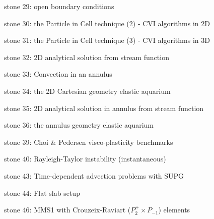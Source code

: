 {\noindent stone 29: open boundary conditions


\noindent stone 30: the Particle in Cell technique (2) - CVI algorithms in 2D


\noindent stone 31: the Particle in Cell technique (3) - CVI algorithms in 3D


\noindent stone 32: 2D analytical solution from stream function


\noindent stone 33: Convection in an annulus 


\noindent stone 34: the 2D Cartesian geometry elastic aquarium


\noindent stone 35: 2D analytical solution in annulus from stream function 


\noindent stone 36: the annulus geometry elastic aquarium


\noindent stone 39: Choi \& Pedersen visco-plasticity benchmarks 


\noindent stone 40: Rayleigh-Taylor instability (instantaneous)


\noindent stone 43: Time-dependent advection problems with SUPG


\noindent stone 44: Flat slab setup 


%

\noindent stone 46: MMS1 with Crouzeix-Raviart ($P_2^+\times P_{-1}$) elements  


}
